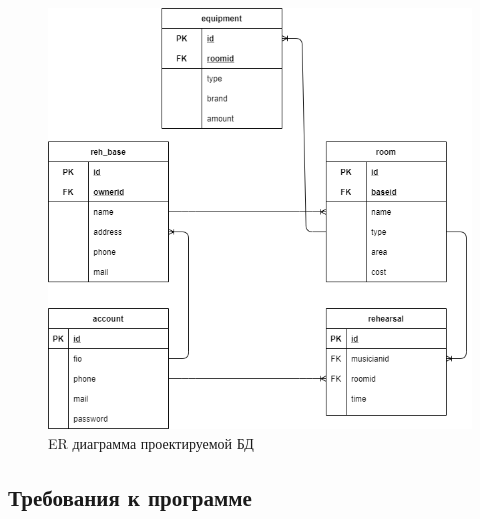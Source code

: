 \begin{figure}[h!]
	\begin{center}
		\includegraphics[scale=0.5]{inc/img/ER_DB.png}
	\end{center}
	\captionsetup{justification=centering}
	\caption{ER диаграмма проектируемой БД}
	\label{img:er}
\end{figure}

\newpage

\subsection{Требования к программе}

